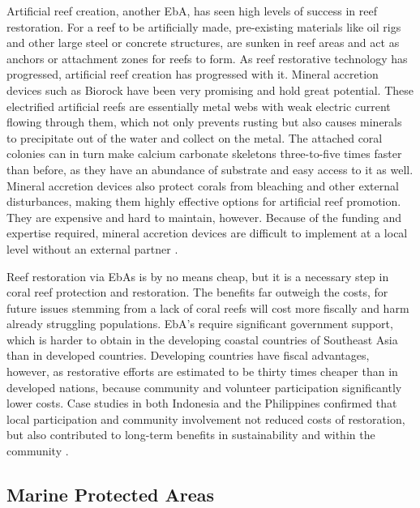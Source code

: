 \documentclass{book}\usepackage{knitr}
\begin{document}
\begin{knitrout}
\begin{kframe}
Artificial reef creation, another EbA, has seen high levels of success in reef restoration. For a reef to be artificially made, pre-existing materials like oil rigs and other large steel or concrete structures, are sunken in reef areas and act as anchors or attachment zones for reefs to form. As reef restorative technology has progressed, artificial reef creation has progressed with it. Mineral accretion devices such as Biorock have been very promising and hold great potential. These electrified artificial reefs are essentially metal webs with weak electric current flowing through them, which not only prevents rusting but also causes minerals to precipitate out of the water and collect on the metal. The attached coral colonies can in turn make calcium carbonate skeletons three-to-five times faster than before, as they have an abundance of substrate and easy access to it as well. Mineral accretion devices also protect corals from bleaching and other external disturbances, making them highly effective options for artificial reef promotion. They are expensive and hard to maintain, however. Because of the funding and expertise required, mineral accretion devices are difficult to implement at a local level without an external partner \citep{areef}.

Reef restoration via EbAs is by no means cheap, but it is a necessary step in coral reef protection and restoration. The benefits far outweigh the costs, for future issues stemming from a lack of coral reefs will cost more fiscally and harm already struggling populations. EbA’s require significant government support, which is harder to obtain in the developing coastal countries of Southeast Asia than in developed countries. Developing countries have fiscal advantages, however, as restorative efforts are estimated to be thirty times cheaper than in developed nations, because community and volunteer participation significantly lower costs. Case studies in both Indonesia and the Philippines confirmed that local participation and community involvement not reduced costs of restoration, but also contributed to long-term benefits in sustainability and within the community \citep{14551496520201201}.

\subsection{Marine Protected Areas}


\end{kframe}
\end{knitrout}
\end{document}
